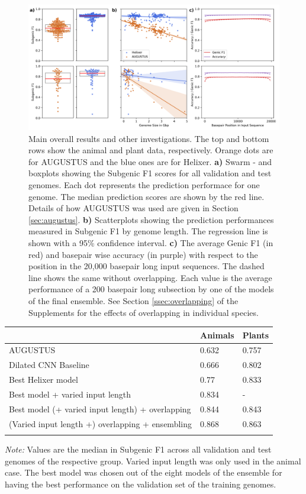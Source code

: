 \documentclass{bioinfo}
\begin{document}
\begin{figure}[!tpb]
\label{fig:main_results}
\centerline{\includegraphics[width=\textwidth]{images/main_results}}
\caption{Main overall results and other investigations. The top and bottom rows
show the animal and plant data, respectively. Orange dots are for AUGUSTUS and 
the blue ones are for Helixer. {\bf a)} Swarm - and boxplots showing the Subgenic F1 
scores for all validation and test genomes. Each dot represents the prediction 
performace for one genome. The median prediction scores are shown by the red line. 
Details of how AUGUSTUS was used are given in Section \ref{sec:augustus}. {\bf b)} 
Scatterplots showing the prediction performances measured in Subgenic F1 by genome 
length. The regression line is shown with a 95\% confidence interval. {\bf c)} The 
average Genic F1 (in red) and basepair wise accuracy (in purple) with respect to 
the position in the 20,000 basepair long input sequences. The dashed line shows the 
same without overlapping. Each value is the average performance of a 200 basepair 
long subsection by one of the models of the final ensemble. 
See Section \ref{ssec:overlapping} of the 
Supplements for the effects of overlapping in individual species.}
\end{figure}

\begin{table}[!t]
 {
\begin{tabular}{@{}lll@{}}
\toprule & Animals & Plants\\
\midrule
AUGUSTUS & 0.632 & 0.757 \\
Dilated CNN Baseline & 0.666 &  0.802 \\
Best Helixer model & 0.77  & 0.833  \\
Best model + varied input length & 0.834  & - \\
Best model (+ varied input length) + overlapping &  0.844  & 0.843  \\
(Varied input length +) overlapping + ensembling & 0.868  & 0.863  \\
\botrule
\end{tabular}}{{\it Note:} Values are the median in Subgenic F1 across all 
validation and test genomes of the respective group. Varied input length was only 
used in the animal case. The best model was chosen out of the eight models of the 
ensemble for having the best performance on the validation set of the training genomes.}
\end{table}
\end{document}
